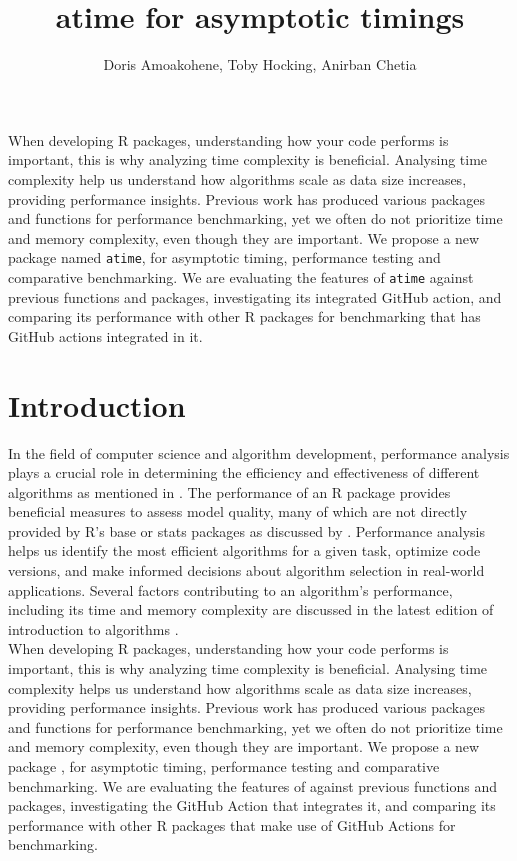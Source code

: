 \title{atime for asymptotic timings }
\author{Doris Amoakohene, Toby Hocking, Anirban Chetia}

\maketitle

\abstract{}


When developing R packages, understanding how your code performs is important, this is why analyzing time complexity is beneficial. Analysing time complexity help us understand how algorithms scale as data size increases, providing performance insights. Previous work has produced various packages and functions for performance benchmarking, yet we often do not prioritize time and memory complexity, even though they are important.
We propose a new package named \texttt{atime}, for asymptotic timing, performance testing and comparative benchmarking. We are evaluating the features of \texttt{atime} against previous functions and packages, investigating its integrated GitHub action, and comparing its performance with other R packages for benchmarking that has GitHub actions integrated in it. 

\section{Introduction}

 In the field of computer science and algorithm development, performance analysis plays a crucial role in determining the efficiency and effectiveness of different algorithms as mentioned in \cite{knuth1997art}. The performance of an R package provides beneficial measures to assess model quality, many of which are not directly provided by R's base or stats packages as discussed by \cite{RcoreTeam}. Performance analysis helps us identify the most efficient algorithms for a given task, optimize code versions, and make informed decisions about algorithm selection in real-world applications. Several factors contributing to an algorithm's performance, including its time and memory complexity are discussed in the latest edition of introduction to algorithms \cite{cormen2022introduction}.\\

When developing R packages, understanding how your code performs is important, this is why analyzing time complexity is beneficial. Analysing time complexity helps us understand how algorithms scale as data size increases, providing performance insights. Previous work has produced various packages and functions for performance benchmarking, yet we often do not prioritize time and memory complexity, even though they are important.
We propose a new package , for asymptotic timing, performance testing and comparative benchmarking. We are evaluating the features of  against previous functions and packages, investigating the GitHub Action that integrates it, and comparing its performance with other R packages that make use of GitHub Actions for benchmarking. 

